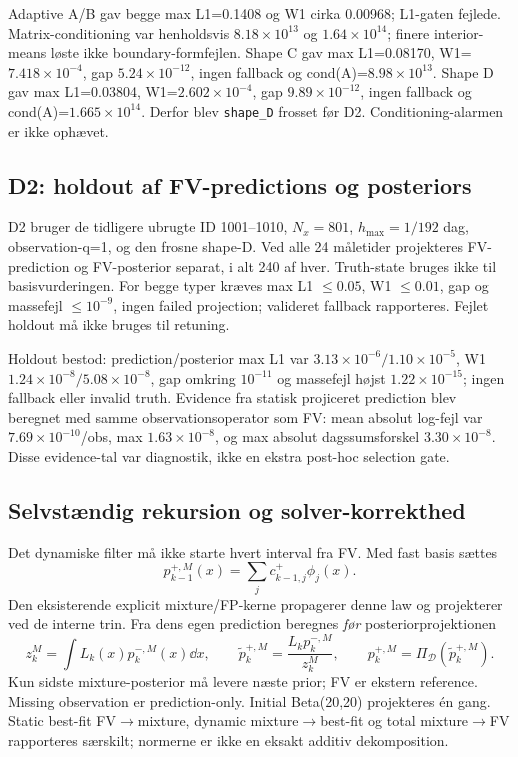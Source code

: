 Adaptive A/B gav begge max L1=0.1408 og W1 cirka 0.00968; L1-gaten fejlede.
Matrix-conditioning var henholdsvis \(8.18\times10^{13}\) og
\(1.64\times10^{14}\); finere interior-means løste ikke boundary-formfejlen.
Shape C gav max L1=0.08170, W1=\(7.418\times10^{-4}\), gap
\(5.24\times10^{-12}\), ingen fallback og cond(A)=\(8.98\times10^{13}\).
Shape D gav max L1=0.03804, W1=\(2.602\times10^{-4}\), gap
\(9.89\times10^{-12}\), ingen fallback og cond(A)=\(1.665\times10^{14}\).
Derfor blev \texttt{shape\_D} frosset før D2. Conditioning-alarmen er ikke ophævet.

\subsection{D2: holdout af FV-predictions og posteriors}
D2 bruger de tidligere ubrugte ID 1001--1010, \(N_x=801\),
\(h_{\max}=1/192\) dag, observation-q=1, og den frosne shape-D.
Ved alle 24 måletider projekteres FV-prediction og FV-posterior separat, i alt 240 af
hver. Truth-state bruges ikke til basisvurderingen. For begge typer kræves max L1
\(\le0.05\), W1 \(\le0.01\), gap og massefejl \(\le10^{-9}\), ingen failed projection;
valideret fallback rapporteres. Fejlet holdout må ikke bruges til retuning.

Holdout bestod: prediction/posterior max L1 var
\(3.13\times10^{-6}/1.10\times10^{-5}\), W1
\(1.24\times10^{-8}/5.08\times10^{-8}\), gap omkring \(10^{-11}\) og massefejl
højst \(1.22\times10^{-15}\); ingen fallback eller invalid truth. Evidence fra
statisk projiceret prediction blev beregnet med samme observationsoperator som FV:
mean absolut log-fejl var \(7.69\times10^{-10}\)/obs, max
\(1.63\times10^{-8}\), og max absolut dagssumsforskel \(3.30\times10^{-8}\).
Disse evidence-tal var diagnostik, ikke en ekstra post-hoc selection gate.

\subsection{Selvstændig rekursion og solver-korrekthed}
Det dynamiske filter må ikke starte hvert interval fra FV. Med fast basis sættes
\[
 p_{k-1}^{+,M}(x)=\sum_j c_{k-1,j}^{+}\phi_j(x).
\]
Den eksisterende explicit mixture/FP-kerne propagerer denne law og projekterer ved de
interne trin. Fra dens egen prediction beregnes \emph{før} posteriorprojektionen
\[
 z_k^M=\int L_k(x)p_k^{-,M}(x)\dd x,\qquad
 \widetilde p_k^{+,M}=\frac{L_kp_k^{-,M}}{z_k^M},\qquad
 p_k^{+,M}=\Pi_{\mathcal D}(\widetilde p_k^{+,M}).
\]
Kun sidste mixture-posterior må levere næste prior; FV er ekstern reference.
Missing observation er prediction-only. Initial Beta(20,20) projekteres én gang.
Static best-fit FV\(\to\)mixture, dynamic mixture\(\to\)best-fit og total
mixture\(\to\)FV rapporteres særskilt; normerne er ikke en eksakt additiv dekomposition.

